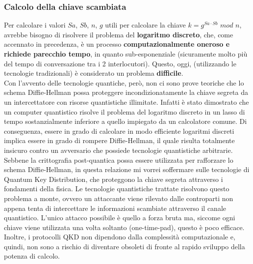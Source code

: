\subsubsection{Calcolo della chiave scambiata}
Per calcolare i valori $Sa$, $Sb$, $n$, $g$ utili per calcolare la chiave $ k = g^{Sa \cdot Sb}$ $mod$ $n$, avrebbe bisogno di risolvere il problema del \textbf{logaritmo discreto}, che, come accennato in precedenza, è un processo \textbf{computazionalmente oneroso e richiede parecchio tempo}, in quanto sub-esponenziale (sicuramente molto più del tempo di conversazione tra i 2 interlocutori). Questo, oggi, (utilizzando le tecnologie tradizionali) è considerato un problema \textbf{difficile}. \\
\cite{kong_review_2022}
Con l'avvento delle tecnologie quantiche, però, non ci sono prove teoriche che lo schema Diffie-Hellman possa proteggere incondizionatamente la chiave segreta da un intercettatore con risorse quantistiche illimitate. Infatti è stato dimostrato che un computer quantistico risolve il problema del logaritmo discreto in un lasso di tempo sostanzialmente inferiore a quello impiegato da un calcolatore comune. Di conseguenza, essere in grado di calcolare in modo efficiente logaritmi discreti implica essere in grado di rompere Diffie-Hellman, il quale risulta totalmente insicuro contro un avversario che possiede tecnologie quantistiche arbitrarie. Sebbene la crittografia post-quantica possa essere utilizzata per rafforzare lo schema Diffie-Hellman, in questa relazione mi vorrei soffermare sulle tecnologie di Quantum Key Distribution, che proteggono la chiave segreta attraverso i fondamenti della fisica. Le tecnologie quantistiche trattate risolvono questo problema a monte, ovvero un attaccante viene rilevato dalle controparti non appena tenta di intercettare le informazioni scambiate attraverso il canale quantistico. L'unico attacco possibile è quello a forza bruta ma, siccome ogni chiave viene utilizzata una volta soltanto (one-time-pad), questo è poco efficace. Inoltre, i protocolli QKD non dipendono dalla complessità computazionale e, quindi, non sono a rischio di diventare obsoleti di fronte al rapido sviluppo della potenza di calcolo. \\

